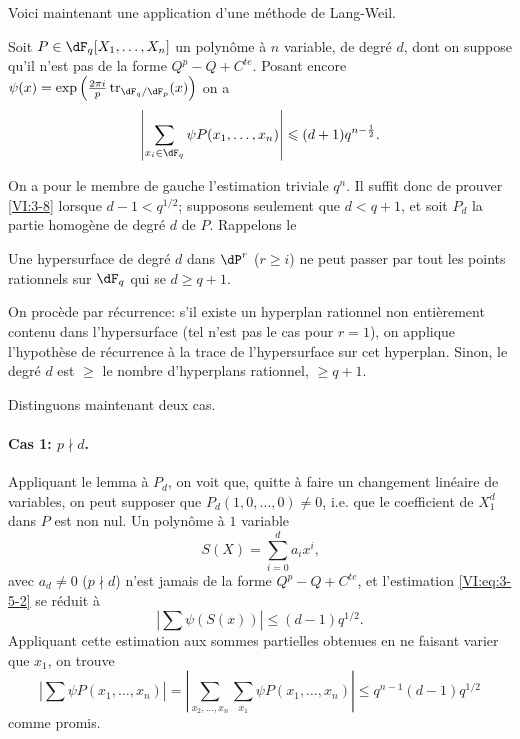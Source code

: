 Voici maintenant une application d'une méthode de Lang-Weil. 





\begin{proposition_}\label{VI:3-8}
Soit $P\in \dF_q[X_1,\dots,X_n]$ un polynôme à $n$ variable, de degré 
$d$, dont on suppose qu'il n'est pas de la forme $Q^p-Q+C^{te}$. Posant encore 
$\psi(x) = \exp\left(\frac{2\pi i}{p} \tr_{\dF_q/\dF_p}(x)\right)$ on a 
\[
  \left|\sum_{x_i\in \dF_q} \psi P(x_1,\dots,x_n)\right| \leqslant (d+1) q^{n-\frac 1 2} \text{.}
\]
\end{proposition_}

On a pour le membre de gauche l'estimation triviale $q^n$. Il suffit donc de 
prouver \ref{VI:3-8} lorsque $d-1<q^{1/2}$; supposons seulement que 
$d<q+1$, et soit $P_d$ la partie homogène de degré $d$ de $P$. Rappelons le 





\begin{lemma_}\label{VI:3-9}
Une hypersurface de degré $d$ dans $\dP^r$ ($r\geqslant i$) ne peut passer 
par tout les points rationnels sur $\dF_q$ qui se $d\geqslant q+1$. 
\end{lemma_}

On procède par récurrence: s'il existe un hyperplan rationnel non 
entièrement contenu dans l'hypersurface (tel n'est pas le cas pour $r=1$), on 
applique l'hypothèse de récurrence à la trace de l'hypersurface sur cet 
hyperplan. Sinon, le degré $d$ est $\geqslant$ le nombre d'hyperplans 
rationnel, $\geqslant q+1$. 

Distinguons maintenant deux cas. 


\paragraph{Cas 1: $p\nmid d$.}
Appliquant le lemma à $P_d$, on voit que, quitte à faire un changement 
linéaire de variables, on peut supposer que $P_d(1,0,\ldots,0)\ne 0$, i.e. 
que le coefficient de $X_1^d$ dans $P$ est non nul. Un polynôme à $1$ 
variable 
\[
  S(X) = \sum_{i=0}^d a_i x^i \text{,} 
\]
avec $a_d\ne 0$ ($p\nmid d$) n'est jamais de la forme $Q^p-Q+C^{t e}$, et 
l'estimation \eqref{VI:eq:3-5-2} se réduit à 
\[
  \left| \sum \psi(S(x)) \right| \leqslant (d-1) q^{1/2} \text{.} 
\]
Appliquant cette estimation aux sommes partielles obtenues en ne faisant varier 
que $x_1$, on trouve 
\[
  \left| \sum \psi P(x_1,\dots,x_n) \right| = \left| \sum_{x_2,\dots,x_n} \sum_{x_1} \psi P(x_1,\dots,x_n)\right| \leqslant q^{n-1} (d-1) q^{1/2} 
\]
comme promis. 


